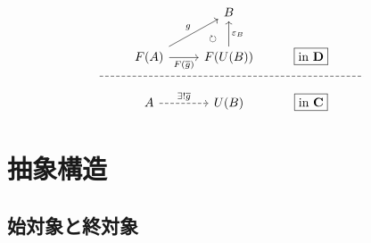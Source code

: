 \documentclass[dvipdfmx,a4j,10pt]{jsarticle}
\theoremstyle{mystyle1}
\theoremstyle{mystyle2}
\begin{document}
	\begin{equation}
		\begin{tikzcd}
			&  & B &  & \\
			& F(A) \arrow[ur,"g","\quad\circlearrowright"'] \arrow[r,"F(\overline{g})"'] & F(U(B)) \arrow[u,"\varepsilon_B"'] & \fbox{in $\mathbf{D}$}\\ [-3.2ex]
			|[alias=X]|\arrow[rrrr,dash,dashed,to=Y] & & & &|[alias=Y]| \\ [-3.2ex]
			& A \arrow[r,dashed,"\exists !\overline{g}"] & U(B) & \fbox{in $\mathbf{C}$} &
		\end{tikzcd}
	\end{equation}

	\section{抽象構造}

	\setcounter{subsection}{1}

	\subsection{始対象と終対象}

	\setcounter{dfn}{8}
\end{document}
